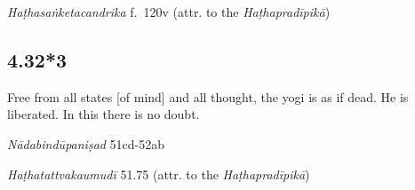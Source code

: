 \begin{ekdosis}
\begin{testimonia}[hp04_032_2]
\emph{Haṭhasaṅketacandrika} f.~120v (attr. to the \emph{Haṭhapradīpikā})
\begin{versinnote}
\end{versinnote}

\end{testimonia}


\subsection*{4.32*3}
\begin{translation}[hp04_032_3]
Free from all states [of mind] and all thought, the yogi is as if dead. He is liberated. In this there is no doubt.
\end{translation}


\begin{testimonia}[hp04_032_3]
\emph{Nādabindūpaniṣad} 51cd-52ab
\begin{versinnote}
\end{versinnote}

\emph{Haṭhatattvakaumudī} 51.75 (attr. to the \emph{Haṭhapradīpikā})
\begin{versinnote}
\end{versinnote}
\end{testimonia}



\end{ekdosis}
